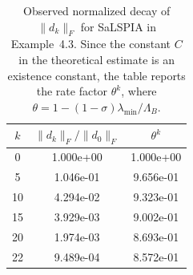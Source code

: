 \begin{table}[H]
\centering
\caption{Observed normalized decay of $\|d_k\|_F$ for SaLSPIA in Example~4.3. Since the constant $C$ in the theoretical estimate is an existence constant, the table reports the rate factor $\theta^k$, where $\theta=1-(1-\sigma)\lambda_{\min}/\Lambda_B$.}
\label{tab:rate_decay_example43}
\begin{tabular}{ccc}
\hline
$k$ & $\|d_k\|_F/\|d_0\|_F$ & $\theta^k$\\
\hline
0 & 1.000e+00 & 1.000e+00\\
5 & 1.046e-01 & 9.656e-01\\
10 & 4.294e-02 & 9.323e-01\\
15 & 3.929e-03 & 9.002e-01\\
20 & 1.974e-03 & 8.693e-01\\
22 & 9.489e-04 & 8.572e-01\\
\hline
\end{tabular}
\end{table}
